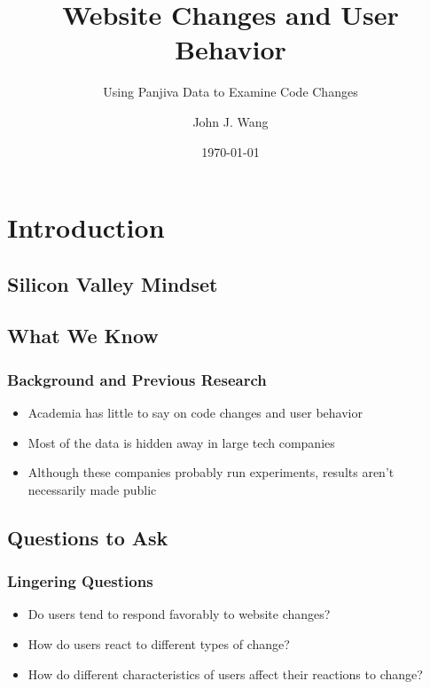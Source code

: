 \documentclass[xcolor=pdftex,dvipsnames,table]{beamer}
\title{Website Changes and User Behavior}
\subtitle{Using Panjiva Data to Examine Code Changes}
\author{John J. Wang}
\date{\today}
\institute{14.27 Final Presentation}
\begin{document}
\frame{\titlepage}

\frame{\tableofcontents}

\section[Introduction]{Introduction}

\frame{\tableofcontents[currentsubsection]}

\subsection{Silicon Valley Mindset}


\subsection{What We Know}

\frame{\tableofcontents[currentsubsection]}

\frame
{
    \frametitle{Background and Previous Research}
    \begin{itemize}
        \item Academia has little to say on code changes and user behavior
        \item Most of the data is hidden away in large tech companies
        \item Although these companies probably run experiments, results aren't necessarily made public
    \end{itemize}
}

\subsection{Questions to Ask}

\frame{\tableofcontents[currentsubsection]}

\frame
{
    \frametitle{Lingering Questions}
    \begin{itemize}
        \item Do users tend to respond favorably to website changes?
        \item How do users react to different types of change?
        \item How do different characteristics of users affect their reactions to change?
    \end{itemize}
}
\end{document}
